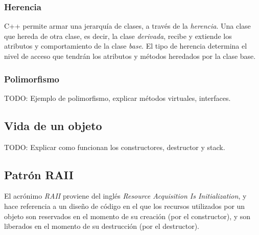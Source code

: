 \documentclass[oneside]{article}
\begin{document}
		\subsubsection{Herencia}
		C++ permite armar una jerarquía de clases, a través de la \emph{herencia}. Una clase que hereda de otra clase, es decir, la clase \emph{derivada}, recibe y extiende los atributos y comportamiento de la clase \emph{base}.
		El tipo de herencia determina el nivel de acceso que tendrán los atributos y métodos heredados por la clase base.

		\subsubsection{Polimorfismo}
		TODO: Ejemplo de polimorfismo, explicar métodos virtuales, interfaces. %

	\subsection{Vida de un objeto}
	TODO: Explicar como funcionan los constructores, destructor y stack.

	\subsection{Patrón RAII}
	El acrónimo \emph{RAII} proviene del inglés \emph{Resource Acquisition Is Initialization}, y hace referencia a un diseño de código en el que los recursos utilizados por un objeto son reservados en el momento de su creación (por el constructor), y son liberados en el momento de su destrucción (por el destructor).
\end{document}
